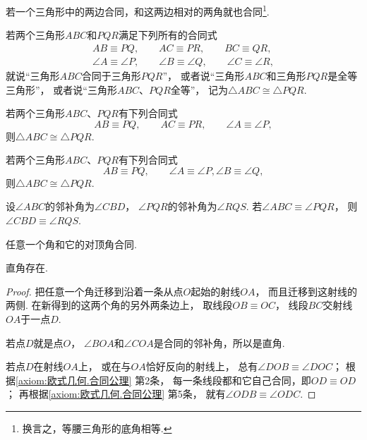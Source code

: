 \begin{theorem}\label{theorem:欧式几何.定理11}
若一个三角形中的两边合同，和这两边相对的两角就也合同\footnote{%
换言之，等腰三角形的底角相等.
}.
\end{theorem}

\begin{definition}
若两个三角形\(ABC\)和\(PQR\)满足下列所有的合同式
\[
\begin{split}
AB \equiv PQ, \qquad
AC \equiv PR, \qquad
BC \equiv QR, \\
\angle A \equiv \angle P, \qquad
\angle B \equiv \angle Q, \qquad
\angle C \equiv \angle R,
\end{split}
\]
就说“三角形\(ABC\)合同于三角形\(PQR\)”，%
或者说“三角形\(ABC\)和三角形\(PQR\)是全等三角形”，%
或者说“三角形\(ABC\)、\(PQR\)全等”，%
记为\(\triangle ABC \cong \triangle PQR\).
\end{definition}

\begin{theorem}[三角形的合同定理1]\label{theorem:欧式几何.定理12}
若两个三角形\(ABC\)、\(PQR\)有下列合同式
\[
AB \equiv PQ, \qquad
AC \equiv PR, \qquad
\angle A \equiv \angle P,
\]
则\(\triangle ABC \cong \triangle PQR\).
\end{theorem}

\begin{theorem}[三角形的合同定理2]\label{theorem:欧式几何.定理13}
若两个三角形\(ABC\)、\(PQR\)有下列合同式
\[
AB \equiv PQ, \qquad
\angle A \equiv \angle P,
\angle B \equiv \angle Q,
\]
则\(\triangle ABC \cong \triangle PQR\).
\end{theorem}

\begin{theorem}\label{theorem:欧式几何.定理14}
设\(\angle ABC\)的邻补角为\(\angle CBD\)，%
\(\angle PQR\)的邻补角为\(\angle RQS\).
若\(\angle ABC \equiv \angle PQR\)，%
则\(\angle CBD \equiv \angle RQS\).
\end{theorem}

\begin{corollary}\label{theorem:欧式几何.对顶角合同}
任意一个角和它的对顶角合同.
\end{corollary}

\begin{corollary}\label{theorem:欧式几何.直角存在}
直角存在.
\begin{proof}
把任意一个角迁移到沿着一条从点\(O\)起始的射线\(OA\)，%
而且迁移到这射线的两侧.
在新得到的这两个角的另外两条边上，%
取线段\(OB \equiv OC\)，%
线段\(BC\)交射线\(OA\)于一点\(D\).

若点\(D\)就是点\(O\)，%
\(\angle BOA\)和\(\angle COA\)是合同的邻补角，所以是直角.

若点\(D\)在射线\(OA\)上，%
或在与\(OA\)恰好反向的射线上，%
总有\(\angle DOB \equiv \angle DOC\)；
根据\cref{axiom:欧式几何.合同公理} 第2条，%
每一条线段都和它自己合同，即\(OD \equiv OD\)；
再根据\cref{axiom:欧式几何.合同公理} 第5条，%
就有\(\angle ODB \equiv \angle ODC\).
\end{proof}
\end{corollary}

